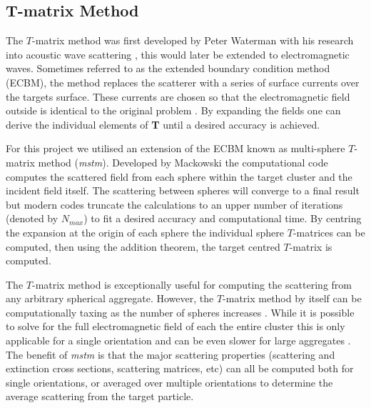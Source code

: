 \subsection{T-matrix Method}

The $T$-matrix method was first developed by Peter Waterman with 
his research into acoustic wave scattering \cite{Waterman1969}, 
this would later be extended to electromagnetic waves. Sometimes 
referred to as the extended boundary condition method (ECBM), the 
method replaces the scatterer with a series of surface currents 
over the targets surface. These currents are chosen so that the 
electromagnetic field outside is identical to the original problem \cite{Wriedt1998}. By expanding the fields one can derive the 
individual elements of \textbf{T} until a desired accuracy is 
achieved. 

For this project we utilised an extension of the ECBM known as 
multi-sphere $T$-matrix method (\textit{mstm}). Developed by 
Mackowski \cite{Mackowski2011} the computational code computes 
the scattered field from each sphere within the target cluster 
and the incident field itself. The scattering between spheres 
will converge to a final result but modern codes truncate 
the calculations to an upper number of iterations (denoted by 
$N_{max}$) to fit a desired accuracy and computational time. 
By centring the expansion at the origin of each sphere the 
individual sphere $T$-matrices can be computed, then using the
addition theorem, the target centred $T$-matrix is computed.

The $T$-matrix method is exceptionally useful for computing the 
scattering from any arbitrary spherical aggregate. However, the 
$T$-matrix method by itself can be computationally taxing as the 
number of spheres increases \cite{Mackowski2011}. While it is 
possible to solve for the full electromagnetic field of each the 
entire cluster this is only applicable for a single orientation 
and can be even slower for large aggregates \cite{Mackowski1996, 
Xu1995}. The benefit of \textit{mstm} is that the major scattering 
properties (scattering and extinction cross sections, scattering 
matrices, etc) can all be computed both for single orientations, 
or averaged over multiple orientations to determine the average 
scattering from the target particle. 

